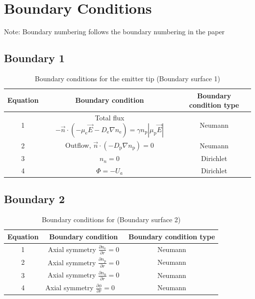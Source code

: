 \documentclass[12pt, a4paper]{report}
\begin{document}
\section{\bf \large Boundary Conditions}
Note: Boundary numbering follows the boundary numbering in the paper
\subsection{Boundary 1}

\begin{table}[!h]
    \centering\begin{tabular}{c|c|c}
        Equation & Boundary condition & Boundary condition type\\ \hline
        1 & Total flux $-\vec{n} \cdot\left(-\mu_{\mathrm{e}} \vec{E} -D_{\mathrm{e}} \nabla n_{\mathrm{e}}\right) =\gamma n_{\mathrm{p}}|\mu_{\mathrm{p}} \vec{E}|$ & Neumann \\ \hline
        2 & Outflow, $\vec{n} \cdot\left(-D_{\mathrm{p}} \nabla n_{\mathrm{p}}\right)=0$  & Neumann \\ \hline
        3 & $n_n=0$ & Dirichlet\\ \hline
        4 & $\Phi=-U_a$ & Dirichlet \\ \hline

    \end{tabular}
    \caption{Boundary conditions for the emitter tip (Boundary surface 1)}
\end{table}
\clearpage

\subsection{Boundary 2}
\begin{table}[!h]
    \centering\begin{tabular}{c|c|c}
        Equation & Boundary condition & Boundary condition type\\ \hline
        1 & Axial symmetry $\frac{\partial n_{\mathrm{e}}}{\partial r}=0$ &  Neumann\\ \hline
        2 & Axial symmetry $\frac{\partial n_{\mathrm{p}}}{\partial r}=0$  & Neumann \\ \hline
        3 & Axial symmetry $\frac{\partial n_{\mathrm{n}}}{\partial r}=0$ & Neumann\\ \hline
        4 & Axial symmetry $\frac{\partial \phi}{\partial r}=0 \quad$ & Neumann \\ \hline

    \end{tabular}
    \caption{Boundary conditions for  (Boundary surface 2)}
\end{table}
\end{document}
